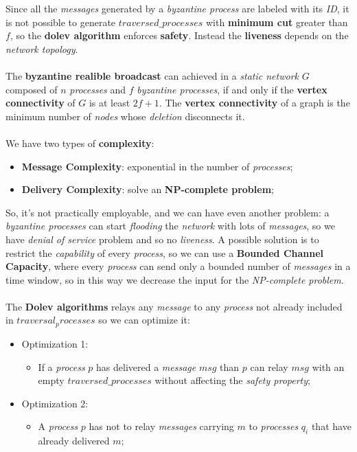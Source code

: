 \documentclass{article}
\begin{document}
Since all the \emph{messages} generated by a \emph{byzantine process} are labeled with its \emph{ID}, it is not possible to generate $traversed\_processes$ with \textbf{minimum cut} greater than $f$, so the \textbf{dolev algorithm} enforces \textbf{safety}. Instead the \textbf{liveness} depends on the \emph{network topology}. \\\\
The \textbf{byzantine realible broadcast} can achieved in a \emph{static network} $G$ composed of $n$ \emph{processes} and $f$ \emph{byzantine processes}, if and only if the \textbf{vertex connectivity} of $G$ is at least $2f+1$. The \textbf{vertex connectivity} of a graph is the minimum number of \emph{nodes} whose \emph{deletion} disconnects it. \\\\
We have two types of \textbf{complexity}:
\begin{itemize}
\item \textbf{Message Complexity}: exponential in the number of \emph{processes};
\item \textbf{Delivery Complexity}: solve an \textbf{NP-complete problem};
\end{itemize} 
So, it's not practically employable, and we can have even another problem: a \emph{byzantine processes }can start \emph{flooding} the \emph{network} with lots of \emph{messages}, so we have \emph{denial of service} problem and so no \emph{liveness}. A possible solution is to restrict the \emph{capability} of every \emph{process}, so we can use a \textbf{Bounded Channel Capacity}, where every \emph{process} can send only a bounded number of \emph{messages} in a time window, so in this way we decrease the input for the \emph{NP-complete problem}. \\\\
The \textbf{Dolev algorithms} relays any \emph{message} to any \emph{process} not already included in $traversal_processes$ so we can optimize it:
\begin{itemize}
\item Optimization 1:
\begin{itemize}
\item If a \emph{process} $p$ has delivered a \emph{message} $msg$ than $p$ can relay $msg$ with an empty $traversed\_processes$ without affecting the \emph{safety property};
\end{itemize}
\item Optimization 2:
\begin{itemize}
\item A \emph{process} $p$ has not to relay \emph{messages} carrying $m$ to \emph{processes} $q_i$ that have already delivered $m$; 
\end{itemize}
\end{itemize}
\end{document}
